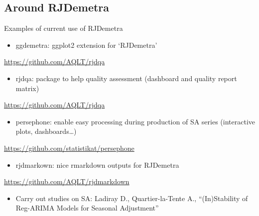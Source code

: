\documentclass[10pt,xcolor=table,color={dvipsnames,usenames},ignorenonframetext,usepdftitle=false,french]{beamer}
\providecommand{\tightlist}{%
  \setlength{\parskip}{0pt}
  }
\begin{document}
\hypertarget{around-rjdemetra}{%
\subsection{Around RJDemetra}\label{around-rjdemetra}}

\begin{frame}{Examples of current use of RJDemetra}
\protect\hypertarget{examples-of-current-use-of-rjdemetra}{}

\begin{itemize}
\tightlist
\item
  ggdemetra: ggplot2 extension for `RJDemetra'
\end{itemize}

\faGithub{} \url{https://github.com/AQLT/rjdqa}

\begin{itemize}
\tightlist
\item
  rjdqa: package to help quality assessment (dashboard and quality
  report matrix)
\end{itemize}

\faGithub{} \url{https://github.com/AQLT/rjdqa}

\begin{itemize}
\tightlist
\item
  persephone: enable easy processing during production of SA series
  (interactive plots, dashboards\ldots{})
\end{itemize}

\faGithub{} \url{https://github.com/statistikat/persephone}

\begin{itemize}
\tightlist
\item
  rjdmarkown: nice rmarkdown outputs for RJDemetra
\end{itemize}

\faGithub{} \url{https://github.com/AQLT/rjdmarkdown}

\begin{itemize}
\tightlist
\item
  Carry out studies on SA: Ladiray D., Quartier-la-Tente A.,
  ``(In)Stability of Reg-ARIMA Models for Seasonal Adjustment''
\end{itemize}

\end{frame}
\end{document}
